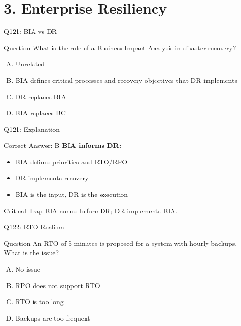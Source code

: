 \documentclass{beamer}
\begin{document}
	\section{3. Enterprise Resiliency}
	
	\begin{frame}{Q121: BIA vs DR}
		\begin{block}{Question}
			What is the role of a Business Impact Analysis in disaster recovery?
		\end{block}
		\begin{enumerate}[(A)]
			\item Unrelated
			\item BIA defines critical processes and recovery objectives that DR implements
			\item DR replaces BIA
			\item BIA replaces BC
		\end{enumerate}
	\end{frame}
	
	\begin{frame}{Q121: Explanation}
		\begin{block}{Correct Answer: B}
			\textbf{BIA informs DR:}
			\begin{itemize}
				\item BIA defines priorities and RTO/RPO
				\item DR implements recovery
				\item BIA is the input, DR is the execution
			\end{itemize}
		\end{block}
		\begin{alertblock}{Critical Trap}
			BIA comes before DR; DR implements BIA.
		\end{alertblock}
	\end{frame}
	
	\begin{frame}{Q122: RTO Realism}
		\begin{block}{Question}
			An RTO of 5 minutes is proposed for a system with hourly backups. What is the issue?
		\end{block}
		\begin{enumerate}[(A)]
			\item No issue
			\item RPO does not support RTO
			\item RTO is too long
			\item Backups are too frequent
		\end{enumerate}
	\end{frame}
	
\end{document}
